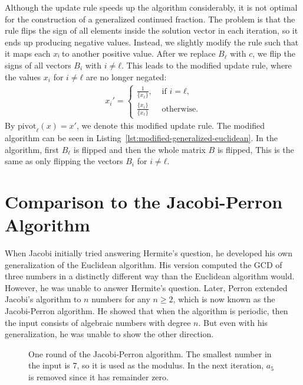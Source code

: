 Although the update rule speeds up the algorithm considerably, it is not
optimal for the construction of a generalized continued fraction.
The problem is that the rule flips the sign of all elements inside the solution
vector in each iteration, so it ends up producing negative values.
Instead, we slightly modify the rule such that it maps each $xᵢ$ to another positive value.
After we replace $B_ℓ$ with $c$, we flip the signs of all vectors $B_i$ with $i ≠ ℓ$.
This leads to the modified update rule, where the values $x_i$ for $i ≠ ℓ$ are
no longer negated:
\begin{align}
  \label{eq:modified-update-rule}
  x_i' =
  \begin{cases}
    \frac{1}{\{x_ℓ\}},  & \text{ if } i = ℓ, \\
    \frac{\{x_i\}}{\{x_ℓ\}} & \text{ otherwise.}
  \end{cases}
\end{align}
By $\mathrm{pivot}_ℓ(x) = x'$, we denote this modified update rule.
The modified algorithm can be seen in Listing~\ref{lst:modified-generalized-euclidean}.
In the algorithm, first $B_ℓ$ is flipped and then the whole matrix $B$ is flipped,
This is the same as only flipping the vectors $B_i$ for $i ≠ ℓ$.

\section{Comparison to the Jacobi-Perron Algorithm}

When Jacobi \cite{Jacobi68} initially tried answering Hermite's question,
he developed his own generalization of the Euclidean algorithm.
His version computed the GCD of three numbers in a distinctly different way
than the Euclidean algorithm would.
However, he was unable to answer Hermite's question.
Later, Perron \cite{Perron07} extended Jacobi's algorithm to $n$ numbers for any $n ≥ 2$,
which is now known as the Jacobi-Perron algorithm.
He showed that when the algorithm is periodic, then the input consists of
algebraic numbers with degree $n$.
But even with his generalization, he was unable to show the other direction.

\begin{figure}[tbp]
  \centering
  
  \caption{
    One round of the Jacobi-Perron algorithm.
    The smallest number in the input is $7$,
    so it is used as the modulus.
    In the next iteration, $a_5$ is removed since it has remainder zero.
  }
  \label{fig:jacobi-perron}
\end{figure}

